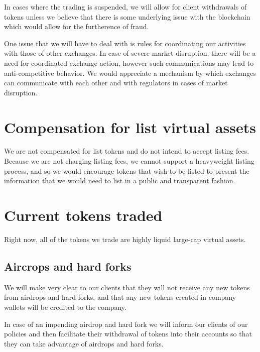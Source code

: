 In cases where the trading is suspended, we will allow for client
withdrawals of tokens unless we believe that there is some underlying
issue with the blockchain which would allow for the furtherence of
fraud.

One issue that we will have to deal with is rules for coordinating our
activities with those of other exchanges.  In case of severe market
disruption, there will be a need for coordinated exchange action,
however such communications may lead to anti-competitive behavior.  We
would appreciate a mechanism by which exchanges can communicate with
each other and with regulators in cases of market disruption.

\section{Compensation for list virtual assets}

We are not compensated for list tokens and do not intend to accept
listing fees.  Because we are not charging listing fees, we cannot
support a heavyweight listing process, and so we would encourage
tokens that wish to be listed to present the information that we would
need to list in a public and transparent fashion.

\section{Current tokens traded}
Right now, all of the tokens we trade are highly liquid large-cap
virtual assets.

\subsection{Aircrops and hard forks}
We will make very clear to our clients that they will not receive any
new tokens from airdrops and hard forks, and that any new tokens
created in company wallets will be credited to the company.

In case of an impending airdrop and hard fork we will inform our
clients of our policies and then facilitate their withdrawal of tokens
into their accounts so that they can take advantage of airdrops and
hard forks.



